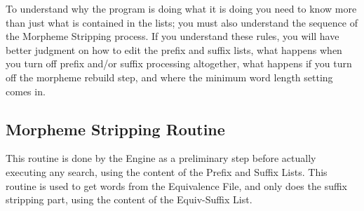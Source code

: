 To understand why the program is doing what it is doing you need to
know more than just what is contained in the lists; you must also
understand the sequence of the Morpheme Stripping process.  If you
understand these rules, you will have better judgment on how to edit
the prefix and suffix lists, what happens when you turn off prefix
and/or suffix processing altogether, what happens if you turn off the
morpheme rebuild step, and where the minimum word length setting comes
in.

\subsection{Morpheme Stripping Routine}

This routine is done by the Engine as a preliminary step before
actually executing any search, using the content of the Prefix and
Suffix Lists.  This routine is used to get words from the Equivalence
File, and only does the suffix stripping part, using the content of
the Equiv-Suffix List.

